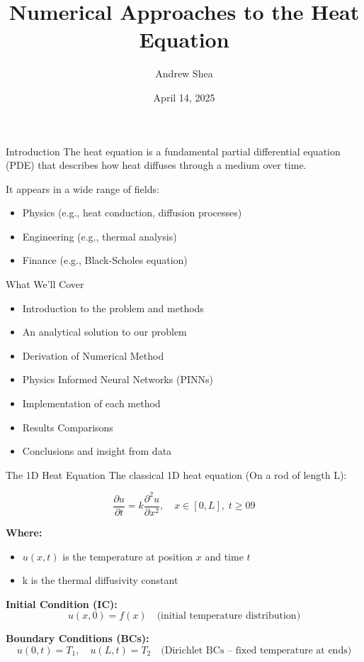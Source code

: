 \documentclass{beamer}
\date{April 14, 2025}
\title{Numerical Approaches to the Heat Equation}
\author{Andrew Shea}
\begin{document}
\frame{\titlepage}

\begin{frame}{Introduction}
The heat equation is a fundamental partial differential equation (PDE) that describes how heat diffuses through a medium over time.

\vspace{0.5em}
It appears in a wide range of fields:
\begin{itemize}
    \item Physics (e.g., heat conduction, diffusion processes)
    \item Engineering (e.g., thermal analysis)
    \item Finance (e.g., Black-Scholes equation)
\end{itemize}


\end{frame}

\begin{frame}{What We'll Cover}
    \begin{itemize}
        \item Introduction to the problem and methods
        \item An analytical solution to our problem
        \item Derivation of Numerical Method
        \item Physics Informed Neural Networks (PINNs)
        \item Implementation of each method
        \item Results Comparisons
        \item Conclusions and insight from data
    \end{itemize}
\end{frame}



\begin{frame}{The 1D Heat Equation}
The classical 1D heat equation (On a rod of length L):

\[
\frac{\partial u}{\partial t} = k \frac{\partial^2 u}{\partial x^2}, \quad x \in [0, L],\; t \ge 09
\]

\textbf{Where:}
\begin{itemize}
    \item \( u(x,t) \) is the temperature at position \( x \) and time \( t \)
    \item k is the thermal diffusivity constant
\end{itemize}

\vspace{0.5em}
\textbf{Initial Condition (IC):}
\[
u(x,0) = f(x) \quad \text{(initial temperature distribution)}
\]

\textbf{Boundary Conditions (BCs):}
\[
u(0,t) = T_{1}, \quad u(L,t) = T_{2} \quad \text{(Dirichlet BCs – fixed temperature at ends)}
\]
\end{frame}
\end{document}
